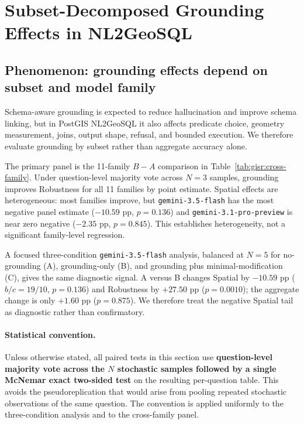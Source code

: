 
\section{Subset-Decomposed Grounding Effects in NL2GeoSQL}
\label{sec:gisr}

\subsection{Phenomenon: grounding effects depend on subset and model family}
\label{sec:gisr:phenomenon}

Schema-aware grounding is expected to reduce hallucination and improve schema linking, but in PostGIS NL2GeoSQL it also affects predicate choice, geometry measurement, joins, output shape, refusal, and bounded execution. We therefore evaluate grounding by subset rather than aggregate accuracy alone.

The primary panel is the 11-family $B-A$ comparison in Table~\ref{tab:gisr:cross-family}. Under question-level majority vote across $N=3$ samples, grounding improves Robustness for all 11 families by point estimate. Spatial effects are heterogeneous: most families improve, but \texttt{gemini-3.5-flash} has the most negative panel estimate ($-10.59$ pp, $p=0.136$) and \texttt{gemini-3.1-pro-preview} is near zero negative ($-2.35$ pp, $p=0.845$). This establishes heterogeneity, not a significant family-level regression.

A focused three-condition \texttt{gemini-3.5-flash} analysis, balanced at $N=5$ for no-grounding (A), grounding-only (B), and grounding plus minimal-modification (C), gives the same diagnostic signal. A versus B changes Spatial by $-10.59$ pp ($b/c=19/10$, $p=0.136$) and Robustness by $+27.50$ pp ($p=0.0010$); the aggregate change is only $+1.60$ pp ($p=0.875$). We therefore treat the negative Spatial tail as diagnostic rather than confirmatory.

\paragraph{Statistical convention.} Unless otherwise stated, all paired tests in this section use \textbf{question-level majority vote across the $N$ stochastic samples followed by a single McNemar exact two-sided test} on the resulting per-question table. This avoids the pseudoreplication that would arise from pooling repeated stochastic observations of the same question. The convention is applied uniformly to the three-condition analysis and to the cross-family panel.

